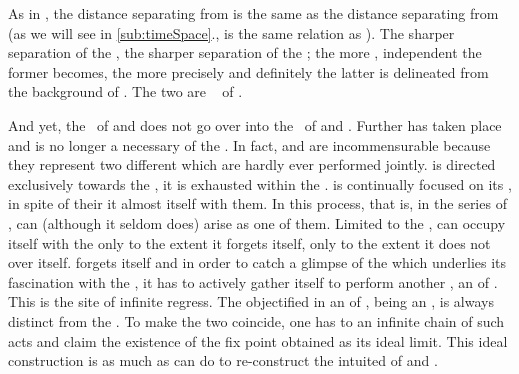 \pa\label{pa:KnasterTarski} As in , the distance separating
 from  is the same as the distance separating
 from  (as we will see in
\ref{sub:timeSpace}.,  is the same relation as
).  The sharper separation of the , the sharper separation
of the ; the more , independent the former becomes, the
more precisely and definitely the latter is delineated from the background of
.  The two are \equi\  of .

And yet, the \equin\ of  and  does not go over
into the \equin\ of  and . Further
 has taken place and  is no longer a
necessary  of the . In fact,  and
 are incommensurable because they represent two different
 which are hardly ever performed jointly.   is
directed exclusively towards the , it is exhausted within the
\hoa.    is
continually focused on its , in spite of their  it
almost  itself with them.  In this process, that is, in the
series of ,  can (although it seldom
does) arise as one of them.  Limited to the \hoa,  can occupy
itself with the  only to the extent it forgets itself, only to the
extent it does not  over itself.   forgets itself and
in order to catch a glimpse of the  which underlies its
fascination with the , it has to actively gather itself to perform
another , an  of .  This is the site of
infinite regress. The  {objectified} in an  of
, being an , is always distinct from the
. To make the two coincide, one has to  an
infinite chain of such acts and claim the existence of the fix point obtained as
its ideal limit. This ideal construction is as much as
 can do to re-construct the intuited  of
 and .

